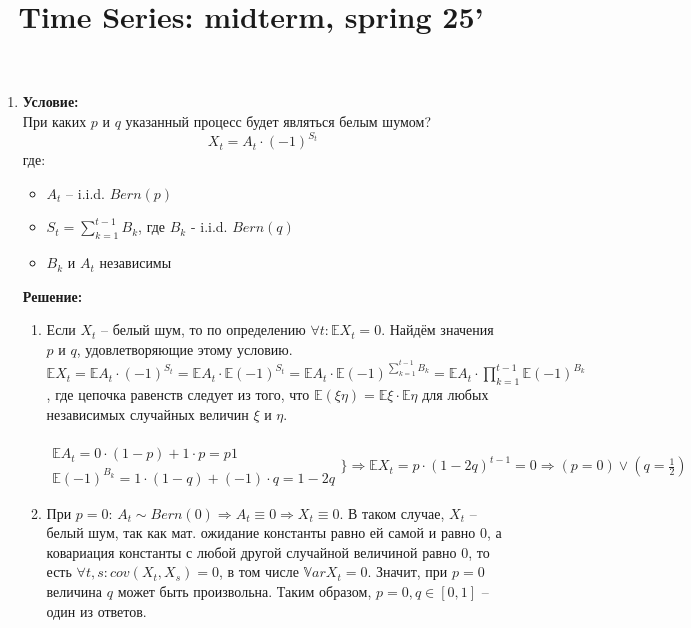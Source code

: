 \documentclass[10pt]{article}
\title{Time Series: midterm, spring 25'}
\begin{document}
\date{}

\maketitle

\begin{enumerate}
\item \textbf{Условие:} \\
При каких $p$ и $q$ указанный процесс будет являться белым шумом?
$$X_t = A_t\cdot(-1)^{S_t}$$
где:
\begin{itemize}
    \item $A_t$ -- i.i.d. $Bern(p)$
    \item $S_t = \sum\limits_{k=1}^{t-1} B_k$, где $B_k$ - i.i.d. $Bern(q)$
    \item $B_k$ и $A_t$ независимы
\end{itemize}

\textbf{Решение:}

\begin{enumerate}[label=(\arabic*)]
    \item Если $X_t$ -- белый шум, то по определению $\forall t:\mathbb{E}X_t = 0$.
    Найдём значения $p$ и $q$, удовлетворяющие этому условию.
    $\mathbb{E}X_t = \mathbb{E}A_t\cdot(-1)^{S_t} = \mathbb{E}A_t\cdot\mathbb{E}(-1)^{S_t} = \mathbb{E}A_t\cdot\mathbb{E}(-1)^{\sum\limits_{k=1}^{t-1} B_k} = \mathbb{E}A_t\cdot\prod\limits_{k=1}^{t-1}\mathbb{E}(-1)^{B_k}$, где
    цепочка равенств следует из того, что $\mathbb{E}(\xi\eta) = \mathbb{E}\xi\cdot\mathbb{E}\eta$ для любых независимых случайных величин $\xi$ и $\eta$. \\\\
    \begin{math}
        \begin{array}{l}
            \mathbb{E}A_t = 0\cdot(1 - p) + 1\cdot p = p1 \\
            \mathbb{E}(-1)^{B_k} = 1\cdot(1-q) + (-1)\cdot q = 1 - 2q
        \end{array}
        \biggr\} \Rightarrow \mathbb{E}X_t = p\cdot(1-2q)^{t-1} = 0\Rightarrow(p=0)\lor(q=\frac{1}{2})
    \end{math}

    \item При $p=0$: $A_t \sim Bern(0) \Rightarrow A_t \equiv 0\Rightarrow X_t \equiv 0$. В таком случае, $X_t$ -- белый шум, так как мат. ожидание константы
    равно ей самой и равно $0$, а ковариация константы с любой другой случайной величиной равно $0$, то есть $\forall t, s: cov(X_t, X_s) = 0$, в том числе $\mathbb{V}ar X_t = 0$.
    Значит, при $p=0$ величина $q$ может быть произвольна. Таким образом, $p=0, q\in[0, 1]$ -- один из ответов.


\end{enumerate}
\end{enumerate}
\end{document}
